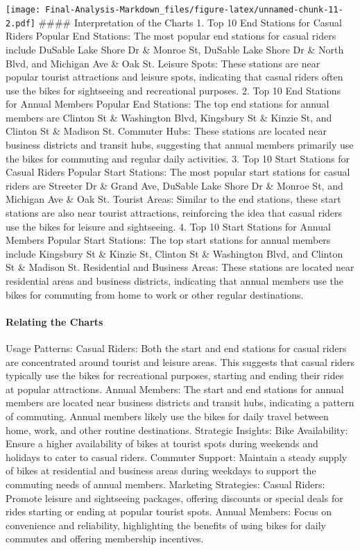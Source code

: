 \documentclass[
]{article}
\begin{document}
\texttt{[image: Final-Analysis-Markdown\_files/figure-latex/unnamed-chunk-11-2.pdf]}
\#\#\#\# Interpretation of the Charts 1. Top 10 End Stations for Casual
Riders Popular End Stations: The most popular end stations for casual
riders include DuSable Lake Shore Dr \& Monroe St, DuSable Lake Shore Dr
\& North Blvd, and Michigan Ave \& Oak St. Leisure Spots: These stations
are near popular tourist attractions and leisure spots, indicating that
casual riders often use the bikes for sightseeing and recreational
purposes. 2. Top 10 End Stations for Annual Members Popular End
Stations: The top end stations for annual members are Clinton St \&
Washington Blvd, Kingsbury St \& Kinzie St, and Clinton St \& Madison
St. Commuter Hubs: These stations are located near business districts
and transit hubs, suggesting that annual members primarily use the bikes
for commuting and regular daily activities. 3. Top 10 Start Stations for
Casual Riders Popular Start Stations: The most popular start stations
for casual riders are Streeter Dr \& Grand Ave, DuSable Lake Shore Dr \&
Monroe St, and Michigan Ave \& Oak St. Tourist Areas: Similar to the end
stations, these start stations are also near tourist attractions,
reinforcing the idea that casual riders use the bikes for leisure and
sightseeing. 4. Top 10 Start Stations for Annual Members Popular Start
Stations: The top start stations for annual members include Kingsbury St
\& Kinzie St, Clinton St \& Washington Blvd, and Clinton St \& Madison
St. Residential and Business Areas: These stations are located near
residential areas and business districts, indicating that annual members
use the bikes for commuting from home to work or other regular
destinations.

\paragraph{Relating the Charts}\label{relating-the-charts}

Usage Patterns: Casual Riders: Both the start and end stations for
casual riders are concentrated around tourist and leisure areas. This
suggests that casual riders typically use the bikes for recreational
purposes, starting and ending their rides at popular attractions. Annual
Members: The start and end stations for annual members are located near
business districts and transit hubs, indicating a pattern of commuting.
Annual members likely use the bikes for daily travel between home, work,
and other routine destinations. Strategic Insights: Bike Availability:
Ensure a higher availability of bikes at tourist spots during weekends
and holidays to cater to casual riders. Commuter Support: Maintain a
steady supply of bikes at residential and business areas during weekdays
to support the commuting needs of annual members. Marketing Strategies:
Casual Riders: Promote leisure and sightseeing packages, offering
discounts or special deals for rides starting or ending at popular
tourist spots. Annual Members: Focus on convenience and reliability,
highlighting the benefits of using bikes for daily commutes and offering
membership incentives.
\end{document}
